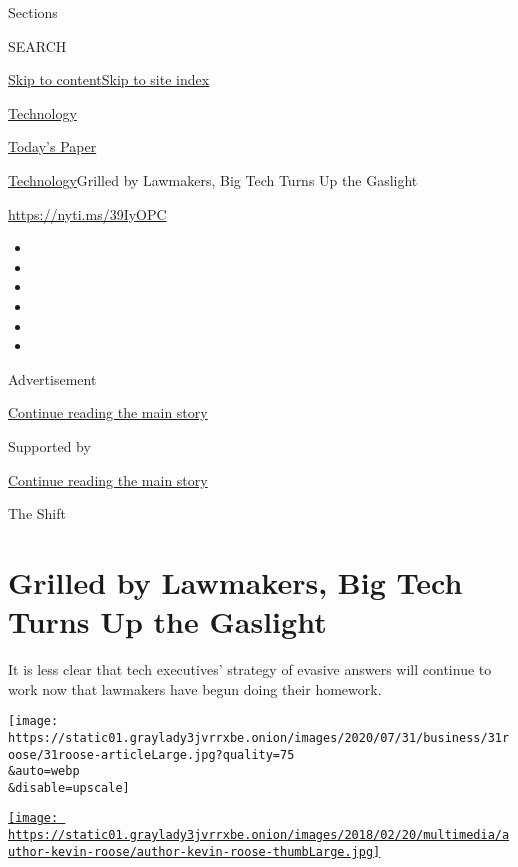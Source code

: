 Sections

SEARCH

\protect\hyperlink{site-content}{Skip to
content}\protect\hyperlink{site-index}{Skip to site index}

\href{https://www.nytimes3xbfgragh.onion/section/technology}{Technology}

\href{https://myaccount.nytimes3xbfgragh.onion/auth/login?response_type=cookie\&client_id=vi}{}

\href{https://www.nytimes3xbfgragh.onion/section/todayspaper}{Today's
Paper}

\href{/section/technology}{Technology}\textbar{}Grilled by Lawmakers,
Big Tech Turns Up the Gaslight

\url{https://nyti.ms/39IyOPC}

\begin{itemize}
\item
\item
\item
\item
\item
\item
\end{itemize}

Advertisement

\protect\hyperlink{after-top}{Continue reading the main story}

Supported by

\protect\hyperlink{after-sponsor}{Continue reading the main story}

The Shift

\hypertarget{grilled-by-lawmakers-big-tech-turns-up-the-gaslight}{%
\section{Grilled by Lawmakers, Big Tech Turns Up the
Gaslight}\label{grilled-by-lawmakers-big-tech-turns-up-the-gaslight}}

It is less clear that tech executives' strategy of evasive answers will
continue to work now that lawmakers have begun doing their homework.

\texttt{[image: https://static01.graylady3jvrrxbe.onion/images/2020/07/31/business/31roose/31roose-articleLarge.jpg?quality=75\\\&auto=webp\\\&disable=upscale]}

\href{https://www.nytimes3xbfgragh.onion/by/kevin-roose}{\texttt{[image: https://static01.graylady3jvrrxbe.onion/images/2018/02/20/multimedia/author-kevin-roose/author-kevin-roose-thumbLarge.jpg]}}

